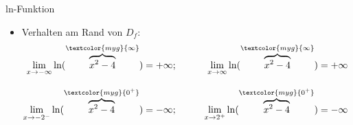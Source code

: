 \begin{Example}{ln-Funktion}{}
\begin{enumerate}
{\begin{itemize}[leftmargin=*]
{\begin{align*}
                        x_{1} = -\sqrt[2]{5} \quad \text{\textit{(e)}}; &\quad x_{2} = \sqrt[2]{5} \quad \text{\textit{(e)}} &&\\[1.5ex]
                        x_{1} \in D_{f}; &\quad x_{2} \in D_{f} &&
                    \end{align*}
                    }
                \item Verhalten am Rand von $D_{f}$:\\{
                    \vspace{-2.0ex}
                    \begin{align*}
                        \lim\limits_{x \to -\infty} \ln(\overbrace{x^2 - 4}^{\textcolor{myg}{\infty}}) &= +\infty; \qquad &\lim\limits_{x \to \infty} \ln(\overbrace{x^2 - 4}^{\textcolor{myg}{\infty}}) &= +\infty &&\\[2.0ex]
                        \lim\limits_{x \to -2^-} \ln(\overbrace{x^2 - 4}^{\textcolor{myg}{0^{+}}}) &= -\infty; \qquad &\lim\limits_{x \to 2^+} \ln(\overbrace{x^2 - 4}^{\textcolor{myg}{0^{+}}}) &= -\infty &&
                    \end{align*}
                    }
            \end{itemize}
            }
    \end{enumerate}
\end{Example}